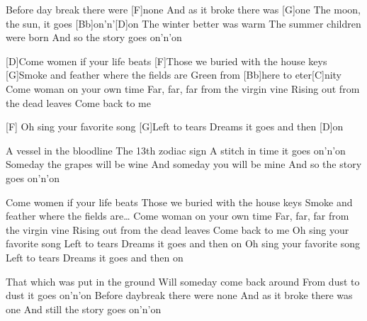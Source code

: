 
\begin{guitar}
[D]Before day break there were [F]none
And as it broke there was [G]one
The moon, the sun, it goes [Bb]on'n'[D]on
The winter better was warm
The summer children were born
And so the story goes on'n'on

[D]Come women if your life beats
[F]Those we buried with the house keys
[G]Smoke and feather where the fields are
Green from [Bb]here to eter[C]nity
Come woman on your own time
Far, far, far from the virgin vine
Rising out from the dead leaves
Come back to me

[F]
Oh sing your favorite song
[G]Left to tears
Dreams it goes and then [D]on

A vessel in the bloodline
The 13th zodiac sign
A stitch in time it goes on'n'on
Someday the grapes will be wine
And someday you will be mine
And so the story goes on'n'on

Come women if your life beats
Those we buried with the house keys
Smoke and feather where the fields are…
Come woman on your own time
Far, far, far from the virgin vine
Rising out from the dead leaves
Come back to me
Oh sing your favorite song
Left to tears
Dreams it goes and then on
Oh sing your favorite song
Left to tears
Dreams it goes and then on

That which was put in the ground
Will someday come back around
From dust to dust it goes on'n'on
Before daybreak there were none
And as it broke there was one
And still the story goes on'n'on
\end{guitar}